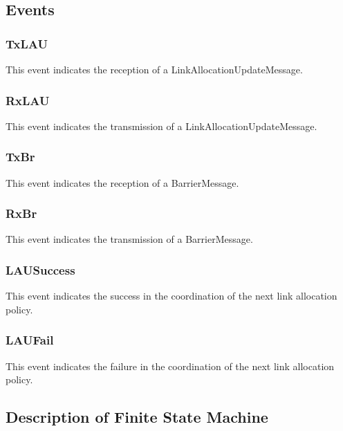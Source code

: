 \subsection{Events}

\subsubsection{TxLAU}
This event indicates the reception of a LinkAllocationUpdateMessage.

\subsubsection{RxLAU}
This event indicates the transmission of a LinkAllocationUpdateMessage.

\subsubsection{TxBr}
This event indicates the reception of a BarrierMessage.

\subsubsection{RxBr}
This event indicates the transmission of a BarrierMessage.

\subsubsection{LAUSuccess}
This event indicates the success in the coordination of the next link allocation policy.

\subsubsection{LAUFail}
This event indicates the failure in the coordination of the next link allocation policy.

\newpage

\subsection{Description of Finite State Machine}

